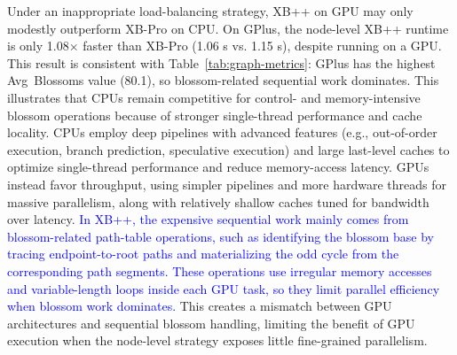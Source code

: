 Under an inappropriate load-balancing strategy, XB++ on GPU may only modestly outperform XB-Pro on CPU.
On GPlus, the node-level XB++ runtime is only 1.08$\times$ faster than XB-Pro (1.06 s vs. 1.15 s), despite running on a GPU. This result is consistent with Table~\ref{tab:graph-metrics}: GPlus has the highest Avg~Blossoms value (80.1), so blossom-related sequential work dominates. 
This illustrates that CPUs remain competitive for control- and memory-intensive blossom operations because of stronger single-thread performance and cache locality. 
CPUs employ deep pipelines with advanced features (e.g., out-of-order execution, branch prediction, speculative execution) and large last-level caches to optimize single-thread performance and reduce memory-access latency. 
GPUs instead favor throughput, using simpler pipelines and more hardware threads for massive parallelism, along with relatively shallow caches tuned for bandwidth over latency. 
\label{para:blossom-node-level-limitation}\label{para:xbpp-sequential-work}
\textcolor{blue}{In XB++, the expensive sequential work mainly comes from blossom-related path-table operations, such as identifying the blossom base by tracing endpoint-to-root paths and materializing the odd cycle from the corresponding path segments. 
These operations use irregular memory accesses and variable-length loops inside each GPU task, so they limit parallel efficiency when blossom work dominates.} This creates a mismatch between GPU architectures and sequential blossom handling, limiting the benefit of GPU execution when the node-level strategy exposes little fine-grained parallelism.


